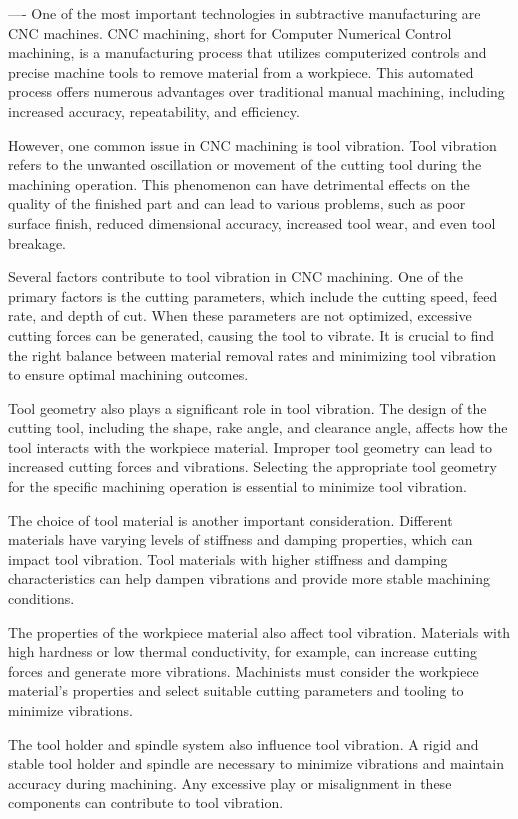 ---- 
One of the most important technologies in subtractive manufacturing are CNC machines.
CNC machining, short for Computer Numerical Control machining, is a manufacturing process that utilizes computerized controls and precise machine tools to remove material from a workpiece. This automated process offers numerous advantages over traditional manual machining, including increased accuracy, repeatability, and efficiency.

However, one common issue in CNC machining is tool vibration. Tool vibration refers to the unwanted oscillation or movement of the cutting tool during the machining operation. This phenomenon can have detrimental effects on the quality of the finished part and can lead to various problems, such as poor surface finish, reduced dimensional accuracy, increased tool wear, and even tool breakage.

Several factors contribute to tool vibration in CNC machining. One of the primary factors is the cutting parameters, which include the cutting speed, feed rate, and depth of cut. When these parameters are not optimized, excessive cutting forces can be generated, causing the tool to vibrate. It is crucial to find the right balance between material removal rates and minimizing tool vibration to ensure optimal machining outcomes.

Tool geometry also plays a significant role in tool vibration. The design of the cutting tool, including the shape, rake angle, and clearance angle, affects how the tool interacts with the workpiece material. Improper tool geometry can lead to increased cutting forces and vibrations. Selecting the appropriate tool geometry for the specific machining operation is essential to minimize tool vibration.

The choice of tool material is another important consideration. Different materials have varying levels of stiffness and damping properties, which can impact tool vibration. Tool materials with higher stiffness and damping characteristics can help dampen vibrations and provide more stable machining conditions.

The properties of the workpiece material also affect tool vibration. Materials with high hardness or low thermal conductivity, for example, can increase cutting forces and generate more vibrations. Machinists must consider the workpiece material's properties and select suitable cutting parameters and tooling to minimize vibrations.

The tool holder and spindle system also influence tool vibration. A rigid and stable tool holder and spindle are necessary to minimize vibrations and maintain accuracy during machining. Any excessive play or misalignment in these components can contribute to tool vibration.

